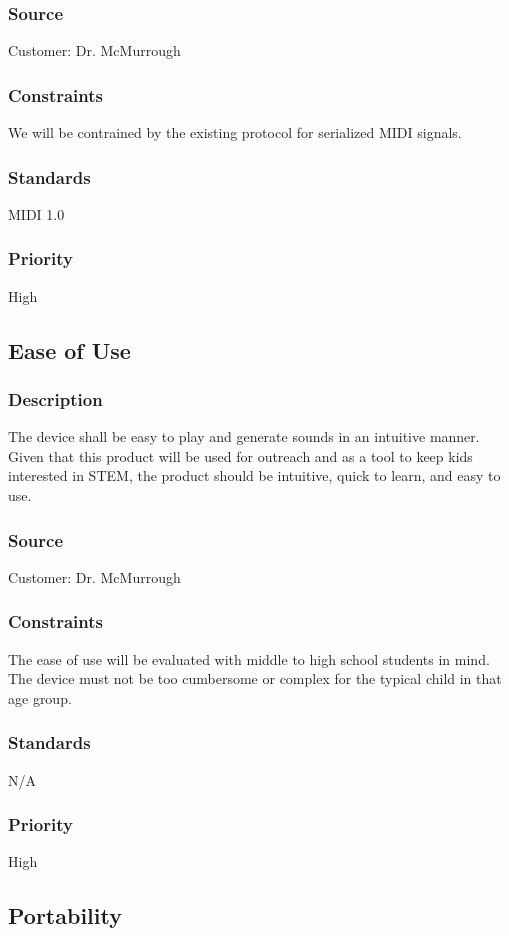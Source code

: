 \subsubsection{Source}
Customer: Dr. McMurrough
\subsubsection{Constraints}
We will be contrained by the existing protocol for serialized MIDI signals. 
\subsubsection{Standards}
MIDI 1.0
\subsubsection{Priority}
High

\subsection{Ease of Use}
\subsubsection{Description}
The device shall be easy to play and generate sounds in an intuitive manner. Given that this product will be used for outreach and as a tool to keep kids interested in STEM, the product should be intuitive, quick to learn, and easy to use. 
\subsubsection{Source}
Customer: Dr. McMurrough
\subsubsection{Constraints}
The ease of use will be evaluated with middle to high school students in mind. The device must not be too cumbersome or complex for the typical child in that age group.
\subsubsection{Standards}
N/A
\subsubsection{Priority}
High

\subsection{Portability}
